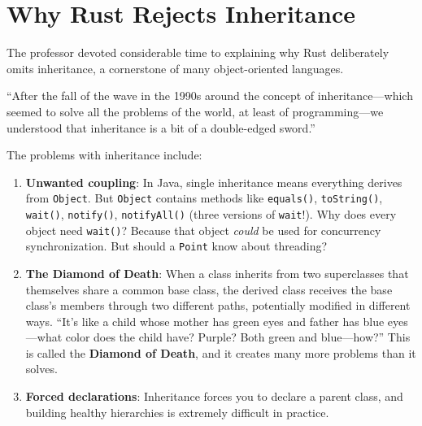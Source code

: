 \section{Why Rust Rejects Inheritance}

The professor devoted considerable time to explaining why Rust deliberately omits inheritance, a cornerstone of many object-oriented languages.

\begin{insightbox}
``After the fall of the wave in the 1990s around the concept of inheritance---which seemed to solve all the problems of the world, at least of programming---we understood that inheritance is a bit of a double-edged sword.''

The problems with inheritance include:

\begin{enumerate}
    \item \textbf{Unwanted coupling}: In Java, single inheritance means everything derives from \texttt{Object}. But \texttt{Object} contains methods like \texttt{equals()}, \texttt{toString()}, \texttt{wait()}, \texttt{notify()}, \texttt{notifyAll()} (three versions of \texttt{wait}!). Why does every object need \texttt{wait()}? Because that object \textit{could} be used for concurrency synchronization. But should a \texttt{Point} know about threading?

    \item \textbf{The Diamond of Death}: When a class inherits from two superclasses that themselves share a common base class, the derived class receives the base class's members through two different paths, potentially modified in different ways. ``It's like a child whose mother has green eyes and father has blue eyes---what color does the child have? Purple? Both green and blue---how?'' This is called the \textbf{Diamond of Death}, and it creates many more problems than it solves.

    \item \textbf{Forced declarations}: Inheritance forces you to declare a parent class, and building healthy hierarchies is extremely difficult in practice.
\end{enumerate}
\end{insightbox}

